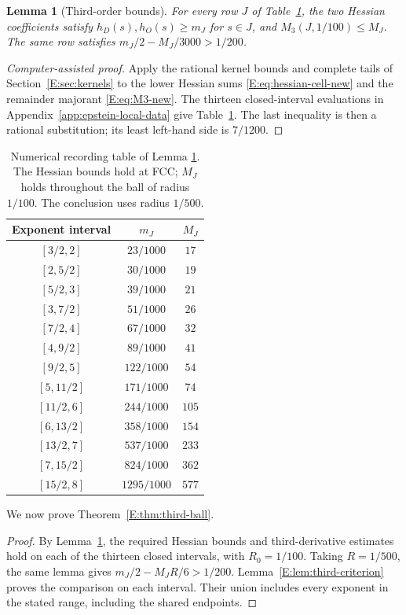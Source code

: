 \documentclass[reqno,english]{amsart}
\newtheorem{lemma}[theorem]{Lemma}
\theoremstyle{definition}
\newtheorem{open problem}[theorem]{Open Problem}
\theoremstyle{remark}
\theoremstyle{plain}
\numberwithin{equation}{section}
\begin{document}
\begin{lemma}[Third-order bounds]\label{app:lem:third-inputs}
For every row $J$ of Table~\ref{E:tab:third-cells}, the two Hessian
coefficients satisfy $h_D(s),h_O(s)\ge m_J$ for $s\in J$, and
$M_3(J,1/100)\le M_J$. The same row satisfies
$m_J/2-M_J/3000>1/200$.
\end{lemma}
\begin{proof}[Computer-assisted proof]
Apply the rational kernel bounds and complete tails of
Section~\ref{E:sec:kernels} to the lower Hessian sums
\eqref{E:eq:hessian-cell-new} and the remainder majorant
\eqref{E:eq:M3-new}. The thirteen closed-interval evaluations in
Appendix~\ref{app:epstein-local-data} give
Table~\ref{E:tab:third-cells}. The last inequality is then a
rational substitution; its least left-hand side is $7/1200$.
\end{proof}

\begin{table}[ht]\centering
\caption{Numerical recording table of Lemma \ref{app:lem:third-inputs}. The Hessian bounds hold at FCC;
$M_J$ holds throughout the ball of radius $1/100$. The conclusion uses
radius $1/500$.}\label{E:tab:third-cells}
\begin{tabular}{ccc}\toprule
Exponent interval&$m_J$&$M_J$\\\midrule
$[3/2,2]$&$23/1000$&$17$\\
$[2,5/2]$&$30/1000$&$19$\\
$[5/2,3]$&$39/1000$&$21$\\
$[3,7/2]$&$51/1000$&$26$\\
$[7/2,4]$&$67/1000$&$32$\\
$[4,9/2]$&$89/1000$&$41$\\
$[9/2,5]$&$122/1000$&$54$\\
$[5,11/2]$&$171/1000$&$74$\\
$[11/2,6]$&$244/1000$&$105$\\
$[6,13/2]$&$358/1000$&$154$\\
$[13/2,7]$&$537/1000$&$233$\\
$[7,15/2]$&$824/1000$&$362$\\
$[15/2,8]$&$1295/1000$&$577$\\\bottomrule
\end{tabular}
\end{table}

We now prove Theorem~\ref{E:thm:third-ball}.

\begin{proof}
By Lemma~\ref{app:lem:third-inputs}, the required Hessian bounds
and third-derivative estimates hold on each of the thirteen closed
intervals, with $R_0=1/100$. Taking $R=1/500$, the same lemma gives
$m_J/2-M_JR/6>1/200$. Lemma~\ref{E:lem:third-criterion} proves
the comparison on each interval. Their union includes every exponent
in the stated range, including the shared endpoints.
\end{proof}
\end{document}
